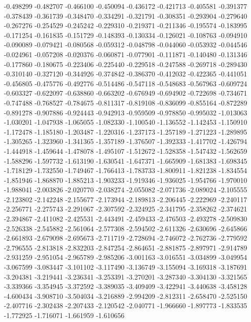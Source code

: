 -0.498299
-0.482707
-0.466100
-0.450094
-0.436172
-0.421713
-0.405581
-0.391377
-0.378439
-0.361739
-0.348470
-0.334291
-0.321791
-0.308351
-0.293904
-0.279640
-0.267276
-0.254529
-0.245242
-0.229310
-0.219371
-0.211346
-0.195574
-0.183995
-0.171254
-0.161835
-0.151729
-0.148393
-0.130334
-0.126021
-0.108763
-0.094910
-0.090089
-0.079421
-0.080568
-0.059312
-0.048798
-0.044060
-0.053932
-0.044546
-0.024961
-0.057208
-0.020376
-0.060871
-0.077901
-0.111871
-0.140480
-0.131346
-0.177860
-0.180675
-0.223406
-0.225440
-0.229518
-0.247588
-0.269718
-0.289430
-0.310140
-0.327120
-0.344926
-0.374842
-0.386370
-0.412032
-0.422365
-0.441051
-0.456805
-0.475776
-0.492776
-0.514486
-0.547118
-0.548683
-0.567963
-0.609724
-0.603327
-0.622097
-0.638860
-0.663202
-0.676949
-0.694902
-0.722698
-0.734671
-0.747488
-0.768527
-0.784675
-0.811317
-0.819108
-0.836099
-0.855164
-0.872289
-0.891278
-0.907886
-0.924443
-0.942913
-0.959509
-0.978850
-0.995032
-1.013063
-1.030201
-1.047938
-1.065055
-1.082330
-1.100540
-1.136552
-1.142453
-1.150910
-1.172478
-1.185180
-1.203487
-1.220316
-1.237173
-1.257189
-1.271223
-1.289895
-1.305265
-1.323960
-1.341365
-1.357189
-1.376507
-1.392333
-1.417702
-1.426794
-1.444918
-1.459644
-1.478078
-1.495107
-1.512672
-1.528358
-1.547432
-1.562659
-1.588296
-1.597732
-1.613190
-1.630541
-1.647371
-1.665909
-1.681383
-1.698345
-1.718129
-1.732550
-1.749467
-1.766413
-1.783733
-1.800911
-1.821238
-1.834554
-1.851946
-1.868870
-1.885213
-1.903233
-1.919346
-1.936025
-1.954766
-1.970010
-1.988041
-2.003826
-2.020770
-2.038274
-2.055082
-2.071736
-2.089024
-2.105555
-2.123802
-2.142248
-2.155677
-2.173944
-2.189813
-2.206445
-2.222969
-2.240117
-2.256771
-2.275743
-2.291067
-2.307592
-2.324925
-2.341795
-2.358262
-2.374621
-2.394867
-2.411082
-2.425531
-2.443491
-2.459433
-2.476503
-2.493278
-2.509830
-2.526338
-2.545882
-2.561064
-2.577308
-2.594502
-2.611326
-2.630696
-2.645866
-2.661893
-2.679098
-2.695673
-2.711719
-2.728694
-2.746072
-2.762736
-2.779592
-2.796555
-2.813818
-2.832203
-2.847254
-2.864651
-2.881875
-2.897971
-2.914789
-2.931259
-2.951054
-2.965789
-2.985206
-3.001163
-3.016551
-3.034899
-3.049954
-3.067599
-3.083447
-3.101102
-3.117490
-3.136749
-3.155094
-3.169318
-3.187691
-3.204381
-3.219441
-3.236341
-3.253391
-3.270201
-3.287340
-3.304130
-3.321565
-3.339366
-3.354945
-3.372592
-3.389035
-3.409409
-3.422941
-3.440638
-3.458128
-4.600434
-3.908710
-3.504034
-3.216889
-2.994209
-2.812311
-2.658470
-2.525150
-2.407716
-2.302438
-2.207433
-2.120542
-2.040771
-1.966660
-1.897773
-1.833535
-1.772925
-1.716071
-1.661959
-1.610656
